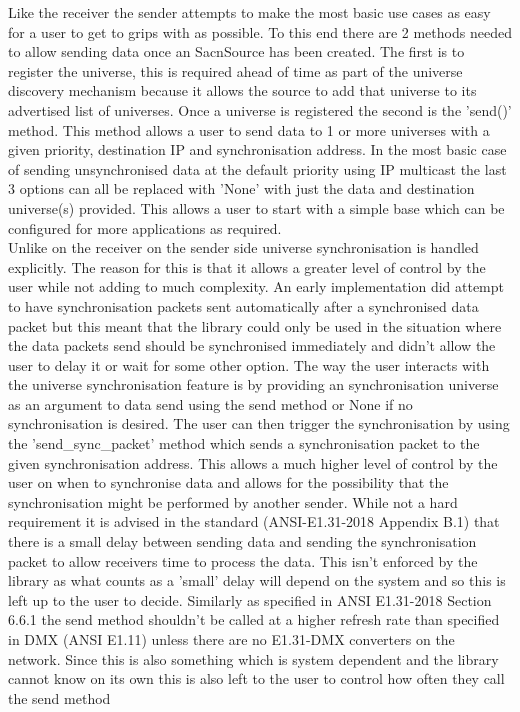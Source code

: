 \documentclass[11pt,a4paper]{article}
\begin{document}
Like the receiver the sender attempts to make the most basic use cases as easy for a user to get to grips with as possible. To this end there are 2 methods needed to allow sending data once an SacnSource has been created. The first is to register the universe, this is required ahead of time as part of the universe discovery mechanism because it allows the source to add that universe to its advertised list of universes. Once a universe is registered the second is the 'send()' method. This method allows a user to send data to 1 or more universes with a given priority, destination IP and synchronisation address. In the most basic case of sending unsynchronised data at the default priority using IP multicast the last 3 options can all be replaced with 'None' with just the data and destination universe(s) provided. This allows a user to start with a simple base which can be configured for more applications as required.\\

Unlike on the receiver on the sender side universe synchronisation is handled explicitly. The reason for this is that it allows a greater level of control by the user while not adding to much complexity. An early implementation did attempt to have synchronisation packets sent automatically after a synchronised data packet but this meant that the library could only be used in the situation where the data packets send should be synchronised immediately and didn't allow the user to delay it or wait for some other option. The way the user interacts with the universe synchronisation feature is by providing an synchronisation universe as an argument to data send using the send method or None if no synchronisation is desired. The user can then trigger the synchronisation by using the 'send\_sync\_packet' method which sends a synchronisation packet to the given synchronisation address. This allows a much higher level of control by the user on when to synchronise data and allows for the possibility that the synchronisation might be performed by another sender.  While not a hard requirement it is advised in the standard (ANSI-E1.31-2018 Appendix B.1) that there is a small delay between sending data and sending the synchronisation packet to allow receivers time to process the data. This isn't enforced by the library as what counts as a 'small' delay will depend on the system and so this is left up to the user to decide. Similarly as specified in ANSI E1.31-2018 Section 6.6.1 the send method shouldn't be called at a higher refresh rate than specified in DMX (ANSI E1.11) unless there are no E1.31-DMX converters on the network. Since this is also something which is system dependent and the library cannot know on its own this is also left to the user to control how often they call the send method\\
\end{document}
